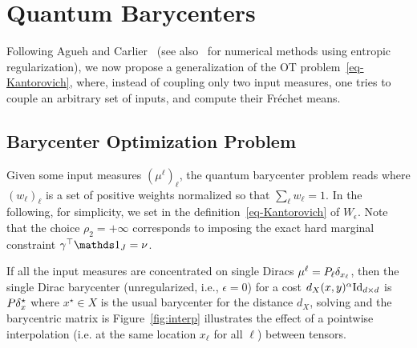 


\section{Quantum Barycenters}
\label{sec-q-bary}

Following Agueh and Carlier~ (see also~\cite{benamou-2015,solomon-2015} for numerical methods using entropic regularization), we now propose a generalization of the OT problem~\eqref{eq-Kantorovich}, where, instead of coupling only two input measures, one tries to couple an arbitrary set of inputs, and compute their Fr\'echet means. 

\newcommand{\weight}{w}

\subsection{Barycenter Optimization Problem}

Given some input measures $(\mu^\ell)_\ell$, the quantum barycenter problem reads
\eql{\label{eq-defn-barycenters}
	\umin{\nu} \sum_\ell \weight_\ell W_\epsilon(\mu^\ell,\nu), 
}
where $(\weight_\ell)_\ell$ is a set of positive weights normalized so that $\sum_\ell \weight_\ell=1$. In the following, for simplicity, we set
in the definition~\eqref{eq-Kantorovich} of $W_\epsilon$. Note that the choice $\rho_2=+\infty$ corresponds to imposing the exact hard marginal constraint $\gamma^\top \ones_J=\nu$. 

\begin{rem}
	If all the input measures are concentrated on single Diracs $\mu^\ell=P_\ell \delta_{x_\ell}$, then the single Dirac barycenter (unregularized, i.e., $\epsilon=0$) for a cost $d_X(x,y)^\alpha \mathrm{Id}_{d \times d}$ is $P \delta_x^\star$ where $x^\star \in X$ is the usual barycenter for the distance $d_X$, solving 
	\eq{
		x^\star \in \argmin_{x} 
			\Ee(x) = \sum_\ell \weight_\ell d_X^\al(x_\ell,x) 
	}
	and the barycentric matrix is
	\eql{\label{eq-barycentric-matrix}
		P = e^{-\frac{\Ee(x^\star)}{\rho}} \exp\Big(\sum_{\ell} \weight_\ell \log(P_\ell)\Big).
	}
	Figure~\ref{fig:interp} illustrates the effect of a pointwise interpolation (i.e. at the same location $x_\ell$ for all $\ell$) between tensors.
\end{rem}


